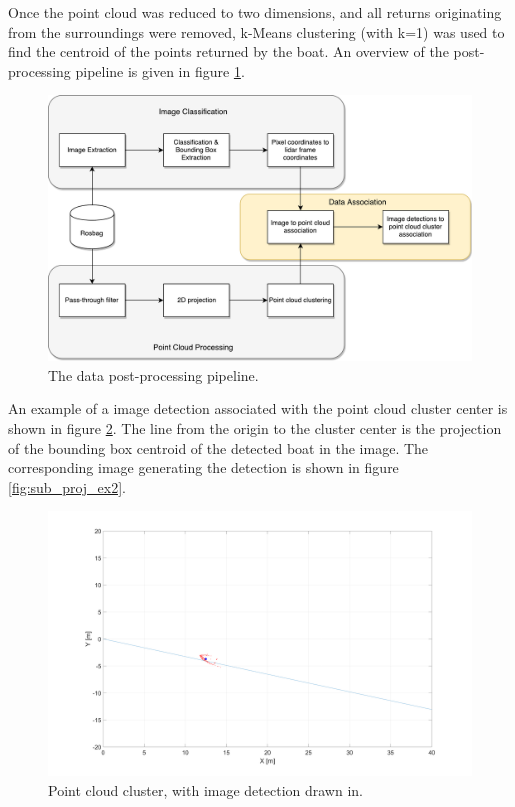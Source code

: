 Once the point cloud was reduced to two dimensions, and all returns originating from the surroundings were removed, k-Means clustering (with k=1) was used to find the centroid of the points returned by the boat.
An overview of the post-processing pipeline is given in figure \ref{fig:post_pipeline}.
\begin{figure}[!htb]
	\centering
	\includegraphics[width=.8\linewidth]{fig/post-processing-pipeline.pdf}
	\caption{The data post-processing pipeline.}
	\label{fig:post_pipeline}
\end{figure}
An example of a image detection associated with the point cloud cluster center is shown in figure \ref{fig:sub_proj_ex1}. The line from the origin to the cluster center is the projection of the bounding box centroid of the detected boat in the image. The corresponding image generating the detection is shown in figure \ref{fig:sub_proj_ex2}.
\begin{figure}[H]
		\centering
		\includegraphics[width=\linewidth]{fig/proj_example.png}
		\caption{Point cloud cluster, with image detection drawn in.}
		\label{fig:sub_proj_ex1}
\end{figure}%
